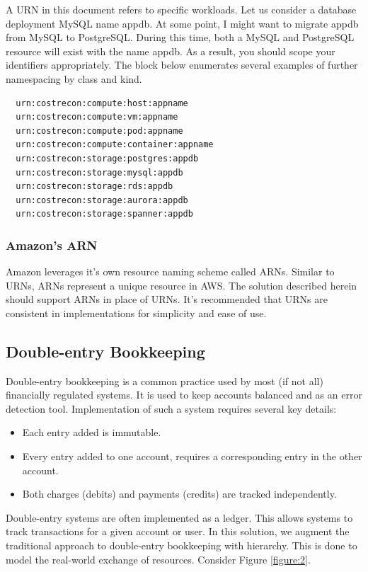 \documentclass[10pt, a4paper, twocolumn]{article}
\begin{document}
    A URN in this document refers to specific workloads.
    Let us consider a database deployment MySQL name appdb.
    At some point, I might want to migrate appdb from MySQL to PostgreSQL.
    During this time, both a MySQL and PostgreSQL resource will exist with the name appdb.
    As a result, you should scope your identifiers appropriately.
    The block below enumerates several examples of further namespacing by class and kind.

\begin{verbatim}
  urn:costrecon:compute:host:appname
  urn:costrecon:compute:vm:appname
  urn:costrecon:compute:pod:appname
  urn:costrecon:compute:container:appname
  urn:costrecon:storage:postgres:appdb
  urn:costrecon:storage:mysql:appdb
  urn:costrecon:storage:rds:appdb
  urn:costrecon:storage:aurora:appdb
  urn:costrecon:storage:spanner:appdb
\end{verbatim}

    \subsubsection*{Amazon's ARN}
      Amazon leverages it's own resource naming scheme called ARNs.
      Similar to URNs, ARNs represent a unique resource in AWS.
      The solution described herein should support ARNs in place of URNs.
      It's recommended that URNs are consistent in implementations for simplicity and ease of use.

  \subsection*{Double-entry Bookkeeping}
    Double-entry bookkeeping is a common practice used by most (if not all) financially regulated systems.
    It is used to keep accounts balanced and as an error detection tool.
    Implementation of such a system requires several key details:

    \begin{itemize}
      \item Each entry added is immutable.
      \item Every entry added to one account, requires a corresponding entry in the other account.
      \item Both charges (debits) and payments (credits) are tracked independently.
    \end{itemize}

    Double-entry systems are often implemented as a ledger.
    This allows systems to track transactions for a given account or user.
    In this solution, we augment the traditional approach to double-entry bookkeeping with hierarchy.
    This is done to model the real-world exchange of resources.
    Consider Figure \ref{figure:2}.
\end{document}
